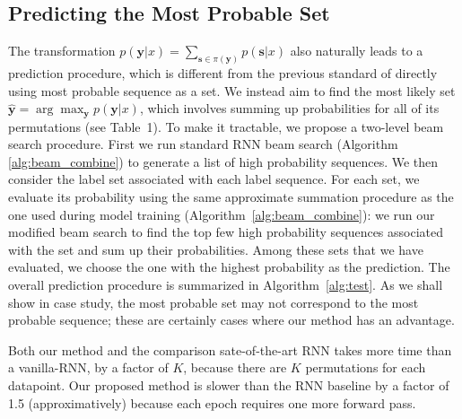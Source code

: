 \subsection{Predicting the Most Probable Set}
The transformation $p(\mathbf{y}|x)=\sum_{\mathbf{s}\in \pi(\mathbf{y})} p(\mathbf{s}|x)$ also naturally leads to a prediction procedure, which is different from the previous standard of directly using most probable sequence as a set. We instead aim to find the most likely set $\hat{\mathbf{y}}=\arg\max_{\mathbf{y}} p(\mathbf{y}|x)$, which involves summing up probabilities for all of its permutations (see Table~1). To make it tractable, we propose a two-level beam search procedure. First we run standard RNN beam search (Algorithm \ref{alg:beam_combine}) to generate a list of high probability sequences.  We then consider the label set associated with each label sequence.  For each set, we evaluate its probability using the same approximate summation procedure as the one used during model training (Algorithm~\ref{alg:beam_combine}): we run our modified beam search to find the top few high probability sequences associated with the set and sum up their probabilities. Among these sets that we have evaluated, we choose the one with the highest probability as the prediction. The overall prediction procedure is summarized in Algorithm~\ref{alg:test}. As we shall show in case study, the most probable set may not correspond to the most probable sequence; these are certainly cases where our method has an advantage.


Both our method and the comparison sate-of-the-art RNN takes more time than a vanilla-RNN, by a factor of $K$, because there are $K$ permutations for each datapoint. Our proposed method is slower than the RNN baseline by a factor of 1.5 (approximatively) because each epoch requires one more forward pass. 

